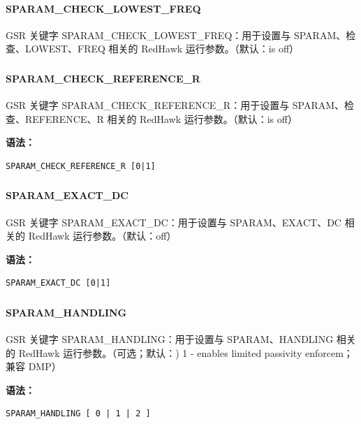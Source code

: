 \paragraph*{SPARAM_CHECK_LOWEST_FREQ}

GSR 关键字 SPARAM_CHECK_LOWEST_FREQ：用于设置与 SPARAM、检查、LOWEST、FREQ 相关的 RedHawk 运行参数。（默认：is off）

\subsubsection{}
\paragraph*{SPARAM_CHECK_REFERENCE_R}

GSR 关键字 SPARAM_CHECK_REFERENCE_R：用于设置与 SPARAM、检查、REFERENCE、R 相关的 RedHawk 运行参数。（默认：is off）

\textbf{语法：}
\begin{lstlisting}
SPARAM_CHECK_REFERENCE_R [0|1]
\end{lstlisting}

\subsubsection{}
\paragraph*{SPARAM_EXACT_DC}

GSR 关键字 SPARAM_EXACT_DC：用于设置与 SPARAM、EXACT、DC 相关的 RedHawk 运行参数。（默认：off）

\textbf{语法：}
\begin{lstlisting}
SPARAM_EXACT_DC [0|1]
\end{lstlisting}

\subsubsection{}
\paragraph*{SPARAM_HANDLING}

GSR 关键字 SPARAM_HANDLING：用于设置与 SPARAM、HANDLING 相关的 RedHawk 运行参数。（可选；默认：) 1 - enables limited passivity enforcem；兼容 DMP）

\textbf{语法：}
\begin{lstlisting}
SPARAM_HANDLING [ 0 | 1 | 2 ]
\end{lstlisting}

